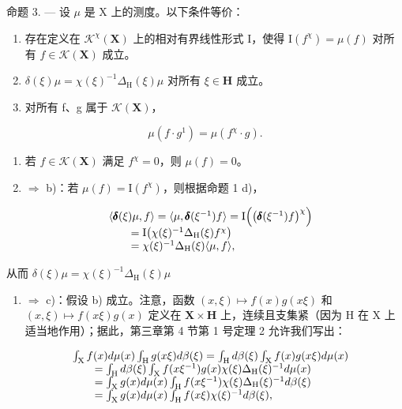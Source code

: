 命题 3. --- 设 \(\mu\) 是 X 上的测度。以下条件等价：

\begin{enumerate}
\def\labelenumi{\alph{enumi})}
\item
  存在定义在 \(\mathcal{K}^{\chi}(\mathbf{X})\) 上的相对有界线性形式 I，使得 \(\mathrm{I}(f^{\chi}) = \mu(f)\) 对所有 \(f\in \mathcal{K}(\mathbf{X})\) 成立。
\item
  \(\delta (\xi)\mu = \chi (\xi)^{-1}\Delta_{\mathrm{H}}(\xi)\mu\) 对所有 \(\xi \in \mathbf{H}\) 成立。
\item
  对所有 f、g 属于 \(\mathcal{K}(\mathbf{X})\)，
\end{enumerate}

\[
\mu (f \cdot g ^ {1}) = \mu (f ^ {\chi} \cdot g).\tag{2}
\]

\begin{enumerate}
\def\labelenumi{\alph{enumi})}
\setcounter{enumi}{3}
\item
  若 \(f \in \mathcal{K}(\mathbf{X})\) 满足 \(f^{\chi} = 0\)，则 \(\mu(f) = 0\)。
\item
  \(\Rightarrow\) b)：若 \(\mu(f)=\mathrm{I}(f^{\chi})\)，则根据命题 1 d)，
\end{enumerate}

\[
\begin{array}{r l} & {\langle \pmb {\delta} (\xi) \mu , f \rangle = \langle \mu , \pmb {\delta} (\xi^ {- 1}) f \rangle = \mathrm{I} \Big (\big (\pmb {\delta} (\xi^ {- 1}) f \big) ^ {\chi} \Big)} \\ & {\qquad = \mathrm{I} \big (\chi (\xi) ^ {- 1} \Delta_ {\mathrm{H}} (\xi) f ^ {\chi} \big)} \\ & {\qquad = \chi (\xi) ^ {- 1} \Delta_ {\mathrm{H}} (\xi) \langle \mu , f \rangle ,} \end{array}
\]

从而 \(\delta (\xi)\mu = \chi (\xi)^{-1}\Delta_{\mathrm{H}}(\xi)\mu\)

\begin{enumerate}
\def\labelenumi{\alph{enumi})}
\setcounter{enumi}{1}
\tightlist
\item
  \(\Rightarrow\) c)：假设 b) 成立。注意，函数 \((x,\xi)\mapsto f(x)g(x\xi)\) 和 \((x,\xi)\mapsto f(x\xi)g(x)\) 定义在 \(\mathbf{X}\times\mathbf{H}\) 上，连续且支集紧（因为 H 在 X 上适当地作用）；据此，第三章第 4 节第 1 号定理 2 允许我们写出：
\end{enumerate}

\[
\begin{array}{r l} & {\int_ {\mathrm{X}} f (x) d \mu (x) \int_ {\mathrm{H}} g (x \xi) d \beta (\xi) = \int_ {\mathrm{H}} d \beta (\xi) \int_ {\mathrm{X}} f (x) g (x \xi) d \mu (x)} \\ & {\qquad = \int_ {\mathrm{H}} d \beta (\xi) \int_ {\mathrm{X}} f (x \xi^ {- 1}) g (x) \chi (\xi) \Delta_ {\mathrm{H}} (\xi) ^ {- 1} d \mu (x)} \\ & {\qquad = \int_ {\mathrm{X}} g (x) d \mu (x) \int_ {\mathrm{H}} f (x \xi^ {- 1}) \chi (\xi) \Delta_ {\mathrm{H}} (\xi) ^ {- 1} d \beta (\xi)} \\ & {\qquad = \int_ {\mathrm{X}} g (x) d \mu (x) \int_ {\mathrm{H}} f (x \xi) \chi (\xi) ^ {- 1} d \beta (\xi),} \end{array}
\]

